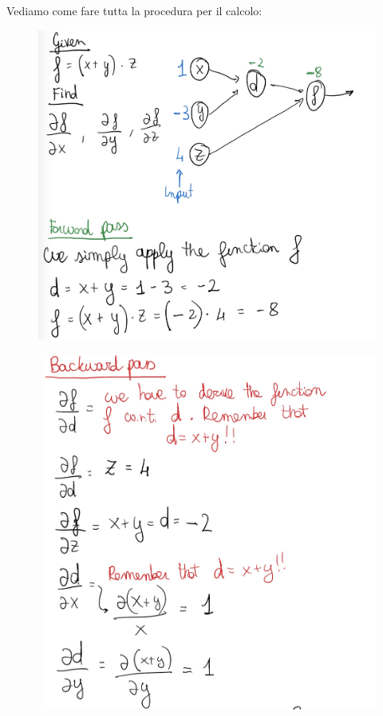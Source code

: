 \documentclass[14pt]{extreport}
\begin{document}
Vediamo come fare tutta la procedura per il calcolo:
\begin{figure}[H]
	\centering
	\includegraphics[width=0.7\linewidth]{392.jpeg}
\end{figure}
\begin{figure}[H]
	\centering
	\includegraphics[width=\linewidth]{393.jpeg}
\end{figure}
\end{document}

